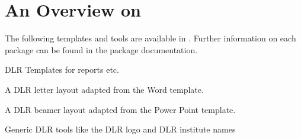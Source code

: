 \documentclass{scrartcl}
\title{\rmlatex}
\subtitle{Overview and Installation Guide}
\author{\printauthor{knob_an}  \printauthor{kloe_ad}}
\begin{document}
%
\maketitle


\begin{abstract}
\rmlatex is a template collection for reports and presentations. Additionally, several useful tools for working with \LaTeX are available. All features and templates are created due to personal interest and are subject to change. All packages are tested using MiKTeX 2.9. However, they are considered as \enquote{as-is} and without any warranty. For questions, suggestion and feedback, please contact the author of the particular package.
\begin{center}\color{red}\bfseries
	\rmlatex requires an up to date \LaTeX{} installation.
\end{center}\bigskip

\rmlatex enthält einige Vorlagen für Berichte und Präsentationen sowie nützliche Werkzeuge zum Erstellen von LaTeX-Dokumenten. Alle Funktionalitäten und Vorlagen sind aus persönlichen Interessen entstanden und permanent in Bearbeitungszustand: Die Pakete sind zwar mit MiKTeX 2.9 getestet, werden aber \enquote{as is} und ohne Gewähr verteilt. Bei Fragen, Anregungen, Kritik wenden Sie sich bitte an die in den Sourcen ausgewiesenen Urheber.
\begin{center}\color{red}\bfseries
	\rmlatex benötigt eine aktuelle \LaTeX{} Installion.
\end{center}\bigskip
{}
\end{abstract}

%
\section{An Overview on \rmlatex}
The following templates and tools are available in \rmlatex. Further information on each package can be found in the package documentation.


DLR Templates for reports etc.

A DLR letter layout adapted from the Word template.

A DLR beamer layout adapted from the Power Point template.

Generic DLR tools like the DLR logo and DLR institute names
\end{document}
